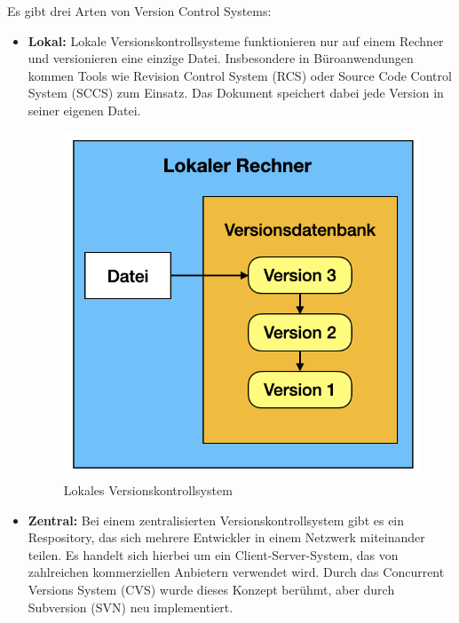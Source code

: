 \newpage
Es gibt drei Arten von Version Control Systems:

\begin{itemize}
	\item \textbf{Lokal:} Lokale Versionskontrollsysteme funktionieren nur auf einem Rechner und versionieren eine einzige Datei. Insbesondere in Büroanwendungen kommen Tools wie Revision Control System (RCS) oder Source Code Control System (SCCS) zum Einsatz. Das Dokument speichert  dabei jede Version in seiner eigenen Datei.
	
	\begin{figure}[H]
	\begin{center}
		\includegraphics[scale=.65]{images/local_vcs.png}
	\end{center}
		\caption{Lokales Versionskontrollsystem}
	\end{figure}
	
	\item \textbf{Zentral:} Bei einem zentralisierten Versionskontrollsystem gibt es ein Respository, das sich mehrere 		Entwickler in einem Netzwerk miteinander teilen. Es handelt sich hierbei um ein Client-Server-System, das 		von zahlreichen kommerziellen Anbietern verwendet wird. Durch das Concurrent Versions System (CVS) 			wurde dieses Konzept berühmt, aber durch Subversion (SVN) neu implementiert.
	

\end{itemize}
